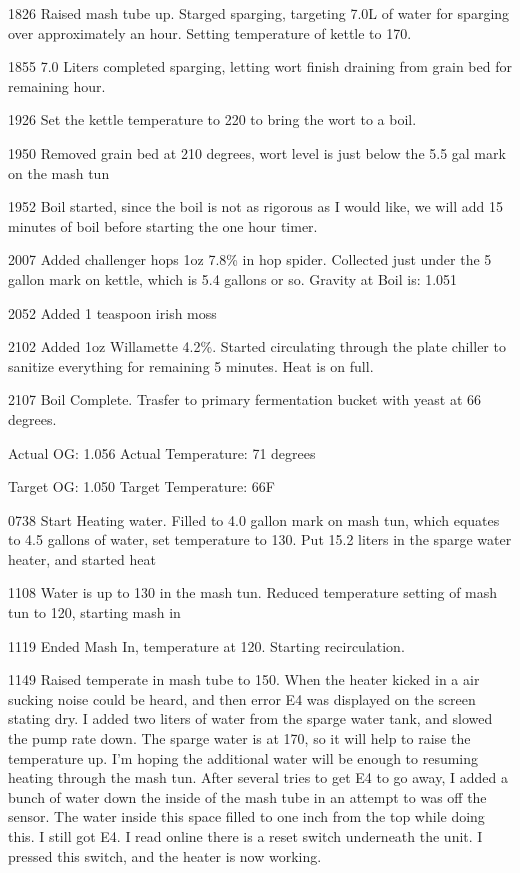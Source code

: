 1826 Raised mash tube up. Starged sparging, targeting 7.0L of water for sparging over approximately an hour.  Setting temperature of kettle to 170.

1855 7.0 Liters completed sparging, letting wort finish draining from grain bed for remaining hour.

1926 Set the kettle temperature to 220 to bring the wort to a boil.

1950 Removed grain bed at 210 degrees, wort level is just below the 5.5 gal mark on the mash tun

1952 Boil started, since the boil is not as rigorous as I would like, we will add 15 minutes of boil before starting the one hour timer.

2007 Added challenger hops 1oz 7.8\% in hop spider.  Collected just under the 5 gallon mark on kettle, which is 5.4 gallons or so.  Gravity at Boil is: 1.051

2052 Added 1 teaspoon irish moss

2102 Added 1oz Willamette 4.2\%.  Started circulating through the plate chiller to sanitize everything for remaining 5 minutes.  Heat is on full.

2107 Boil Complete.  Trasfer to primary fermentation bucket with yeast at 66 degrees.

Actual OG: 1.056
Actual Temperature: 71 degrees

Target OG: 1.050
Target Temperature: 66F

\def\todaysdate{20191201}
\newday{\todaysdate}\label{\todaysdate}

\FloatBarrier{}
0738 Start Heating water.  Filled to 4.0 gallon mark on mash tun, which equates to 4.5 gallons of water, set temperature to 130.  Put 15.2 liters in the sparge water heater, and started heat

1108 Water is up to 130 in the mash tun. Reduced temperature setting of mash tun to 120, starting mash in

1119 Ended Mash In, temperature at 120.  Starting recirculation.

1149 Raised temperate in mash tube to 150.  When the heater kicked in a air sucking noise could be heard, and then error E4 was displayed on the screen stating dry.  I added two liters of water from the sparge water tank, and slowed the pump rate down.  The sparge water is at 170, so it will help to raise the temperature up.  I'm hoping the additional water will be enough to resuming heating through the mash tun.  After several tries to get E4 to go away, I added a bunch of water down the inside of the mash tube in an attempt to was off the sensor.  The water inside this space filled to one inch from the top while doing this.  I still got E4.  I read online there is a reset switch underneath the unit.  I pressed this switch, and the heater is now working.  

